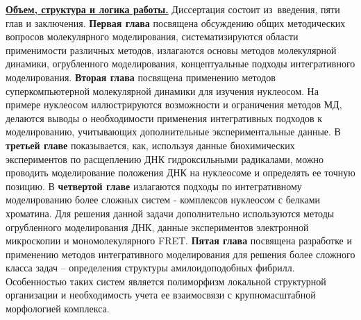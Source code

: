 \begin{refsection}
{         %
        }
    \end{refsection}%









{\acknowledge} 


\underline{\textbf{Объем, структура и логика работы.}} Диссертация состоит из~введения, пяти глав и заключения.
\textbf{Первая глава} посвящена обсуждению общих методических вопросов молекулярного моделирования, систематизируются области применимости различных методов, излагаются основы методов молекулярной динамики, огрубленного моделирования, концептуальные подходы интегративного моделирования. \textbf{Вторая глава} посвящена применению методов суперкомпьютерной молекулярной динамики для изучения нуклеосом. На примере нуклеосом иллюстрируются возможности и ограничения методов МД, делаются выводы о необходимости применения интегративных подходов к моделированию, учитывающих дополнительные экспериментальные данные. В \textbf{третьей главе} показывается, как, используя данные биохимических экспериментов по расщеплению ДНК гидроксильными радикалами, можно проводить моделирование положения ДНК на нуклеосоме и определять ее точную позицию. В \textbf{четвертой главе} излагаются подходы по интегративному моделированию более сложных систем - комплексов нуклеосом с белками хроматина. Для решения данной задачи дополнительно используются методы огрубленного моделирования ДНК, данные экспериментов электронной микроскопии и мономолекулярного FRET.  \textbf{Пятая глава} посвящена разработке и применению методов интегративного моделирования для решения более сложного класса задач -- определения структуры амилоидоподобных фибрилл. Особенностью таких систем является полиморфизм локальной структурной организации и необходимость учета ее взаимосвязи с крупномасштабной морфологией комплекса.

